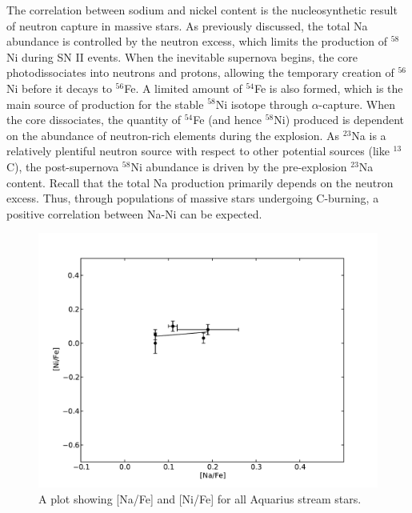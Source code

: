 \documentclass{emulateapj}
\begin{document}
The correlation between sodium and nickel content is the nucleosynthetic result of neutron capture in massive stars. As previously discussed, the total Na abundance is controlled by the neutron excess, which limits the production of $^{58}$Ni during SN II events. When the inevitable supernova begins, the core photodissociates into neutrons and protons, allowing the temporary creation of $^{56}$Ni before it decays to $^{56}$Fe. A limited amount of $^{54}$Fe is also formed, which is the main source of production for the stable $^{58}$Ni isotope through $\alpha$-capture. When the core dissociates, the quantity of $^{54}$Fe (and hence $^{58}$Ni) produced is dependent on the abundance of neutron-rich elements during the explosion. As $^{23}$Na is a relatively plentiful neutron source with respect to other potential sources (like $^{13}$C), the post-supernova $^{58}$Ni abundance is driven by the pre-explosion $^{23}$Na content. Recall that the total Na production primarily depends on the neutron excess. Thus, through populations of massive stars undergoing C-burning, a positive correlation between Na-Ni can be expected. 


\begin{figure}[h]
	\includegraphics[width=\columnwidth]{./figures/aquarius-na-ni.pdf}
	\caption{A plot showing [Na/Fe] and [Ni/Fe] for all Aquarius stream stars.}
	\label{fig:na-ni}
\end{figure}
\end{document}
